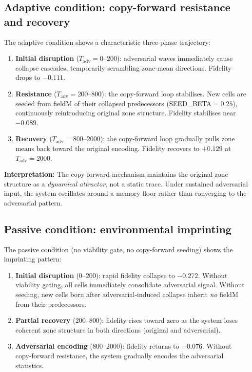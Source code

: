 \documentclass[11pt]{article}
\begin{document}
\subsection{Adaptive condition: copy-forward resistance and recovery}

The adaptive condition shows a characteristic three-phase trajectory:
\begin{enumerate}[itemsep=1pt]
  \item \textbf{Initial disruption} ($T_\mathrm{adv} = 0$--$200$): adversarial waves
    immediately cause collapse cascades, temporarily scrambling zone-mean directions.
    Fidelity drops to $-0.111$.
  \item \textbf{Resistance} ($T_\mathrm{adv} = 200$--$800$): the copy-forward loop
    stabilises. New cells are seeded from fieldM of their collapsed predecessors
    (SEED\_BETA$=0.25$), continuously reintroducing original zone structure.
    Fidelity stabilises near $-0.089$.
  \item \textbf{Recovery} ($T_\mathrm{adv} = 800$--$2000$): the copy-forward loop
    gradually pulls zone means back toward the original encoding.
    Fidelity recovers to $+0.129$ at $T_\mathrm{adv}=2000$.
\end{enumerate}

\textbf{Interpretation:} The copy-forward mechanism maintains the original zone structure
as a \emph{dynamical attractor}, not a static trace.
Under sustained adversarial input, the system oscillates around a memory floor
rather than converging to the adversarial pattern.

\subsection{Passive condition: environmental imprinting}

The passive condition (no viability gate, no copy-forward seeding) shows
the imprinting pattern:
\begin{enumerate}[itemsep=1pt]
  \item \textbf{Initial disruption} ($0$--$200$): rapid fidelity collapse to $-0.272$.
    Without viability gating, all cells immediately consolidate adversarial signal.
    Without seeding, new cells born after adversarial-induced collapse inherit
    \emph{no} fieldM from their predecessors.
  \item \textbf{Partial recovery} ($200$--$800$): fidelity rises toward zero as the
    system loses coherent zone structure in both directions (original and adversarial).
  \item \textbf{Adversarial encoding} ($800$--$2000$): fidelity returns to $-0.076$.
    Without copy-forward resistance, the system gradually encodes the adversarial statistics.
\end{enumerate}
\end{document}
